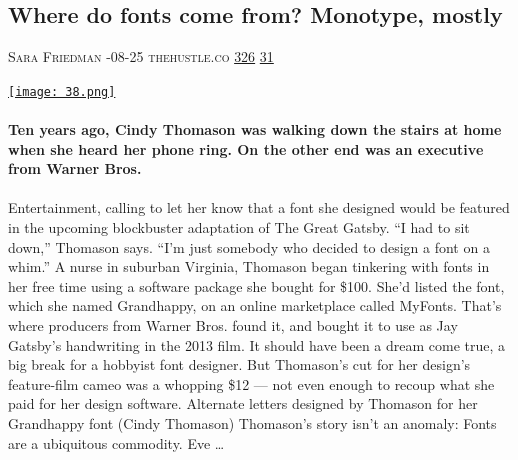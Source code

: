 \documentclass[10pt,a4paper]{article}
\begin{document}
\begin{multicols}{2}
\raggedcolumns
\noindent\begin{minipage}{\linewidth}
\medskip
\subsection{Where do fonts come from? Monotype, mostly}
\textsc{\footnotesize
{\scriptsize\faUser}\space 
Sara Friedman 
{\scriptsize\faCalendar}-08-25 
{\scriptsize\faGlobe}\space 
thehustle.co 
{\scriptsize\faThumbsOUp}\space 
\href{http://news.ycombinator.com/item?id=37283860\&utm\_term=comment}{326} 
{\scriptsize\faComments}\space 
\href{http://news.ycombinator.com/item?id=37283860\&utm\_term=comment}{31} 
}
\par\medskip\noindent
\href{https://thehustle.co/where-do-fonts-come-from/?utm\_source=hackernewsletter\&utm\_medium=email\&utm\_term=design}{
    \texttt{[image: 38.png]}
}
\end{minipage}
\paragraph{}
\textbf{Ten years ago, Cindy Thomason was walking down the stairs at home when she heard her phone ring.
On the other end was an executive from Warner Bros.}
\paragraph{}
 Entertainment, calling to let her know that a font she designed would be featured in the upcoming blockbuster adaptation of The Great Gatsby.
“I had to sit down,” Thomason says. “I’m just somebody who decided to design a font on a whim.”
A nurse in suburban Virginia, Thomason began tinkering with fonts in her free time using a software package she bought for \$100. She’d listed the font, which she named Grandhappy, on an online marketplace called MyFonts.
That’s where producers from Warner Bros. found it, and bought it to use as Jay Gatsby’s handwriting in the 2013 film.
It should have been a dream come true, a big break for a hobbyist font designer. But Thomason’s cut for her design’s feature-film cameo was a whopping \$12 — not even enough to recoup what she paid for her design software.
Alternate letters designed by Thomason for her Grandhappy font (Cindy Thomason)
Thomason’s story isn’t an anomaly: Fonts are a ubiquitous commodity. Eve
\dots\par
\noindent\begin{minipage}{\linewidth}
\medskip

\end{minipage}
\end{multicols}
\end{document}
